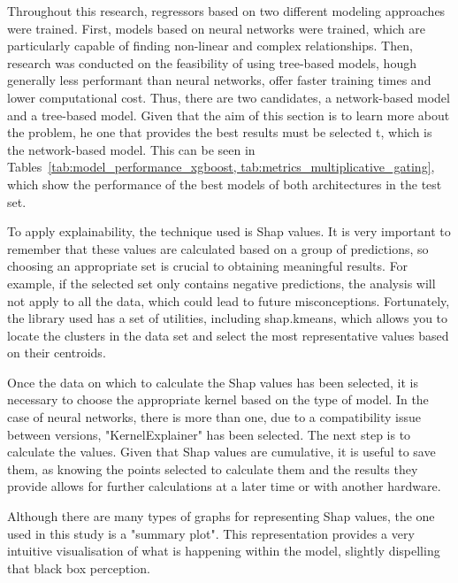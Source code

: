 Throughout this research, regressors based on two different modeling approaches were trained. First, models based on neural networks were trained, which are particularly capable of finding non-linear and complex relationships. Then, research was conducted on the feasibility of using tree-based models, hough generally less performant than neural networks, offer faster training times and lower computational cost. Thus, there are two candidates, a network-based model and a tree-based model. Given that the aim of this section is to learn more about the problem, he one that provides the best results must be selected t, which is the network-based model. This can be seen in Tables~\ref{tab:model_performance_xgboost, tab:metrics_multiplicative_gating}, which show the performance of the best models of both architectures in the test set.


To apply explainability, the technique used is Shap values. It is very important to remember that these values are calculated based on a group of predictions, so choosing an appropriate set is crucial to obtaining meaningful results. For example, if the selected set only contains negative predictions, the analysis will not apply to all the data, which could lead to future misconceptions. Fortunately, the library used has a set of utilities, including shap.kmeans, which allows you to locate the clusters in the data set and select the most representative values based on their centroids.

Once the data on which to calculate the Shap values has been selected, it is necessary to choose the appropriate kernel based on the type of model. In the case of neural networks, there is more than one, due to a compatibility issue between versions, "KernelExplainer" has been selected. The next step is to calculate the values. Given that Shap values are cumulative, it is useful to save them, as knowing the points selected to calculate them and the results they provide allows for further calculations at a later time or with another hardware.

Although there are many types of graphs for representing Shap values, the one used in this study is a "summary plot". This representation provides a very intuitive visualisation of what is happening within the model, slightly dispelling that black box perception.

